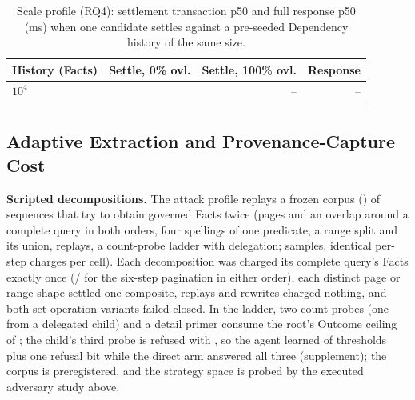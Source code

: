\documentclass[10pt,journal,compsoc]{IEEEtran}
\begin{document}
\begin{table}[t]
\centering
\caption{Scale profile (RQ4): settlement transaction p50 and full response
p50 (ms) when one candidate settles against a pre-seeded Dependency history
of the same size.}
\label{tab:scale-main}
\scriptsize
\setlength{\tabcolsep}{4pt}
\begin{tabular}{lrrr}
\toprule
History (Facts) & Settle, 0\% ovl. & Settle, 100\% ovl. & Response \\
\midrule
$10^4$ & \FinalVFivePublicationScaleSettleTenKMS{} & -- & -- \\
\FinalVFivePublicationScaleMillionHistory{} & \FinalVFivePublicationScaleSettleMillionMS{} & \FinalVFivePublicationScaleSettleMillionFullOverlapMS{} & \FinalVFivePublicationScaleMillionDrainMS{} \\
\bottomrule
\end{tabular}
\end{table}

\subsection{Adaptive Extraction and Provenance-Capture Cost}
\label{sec:attack-provsql}

\textbf{Scripted decompositions.} The attack profile replays a frozen
corpus (\FinalVFivePublicationAttackCorpusDigest{}) of
\FinalVFivePublicationAttackSequences{} sequences that try to obtain
governed Facts twice (pages and an overlap around a complete query in both
orders, four spellings of one predicate, a range split and its union,
replays, a count-probe ladder with delegation;
\FinalVFivePublicationAttackSamples{} samples, identical per-step charges
per cell). Each decomposition was charged its complete query's Facts
exactly once
(\FinalVFivePublicationAttackPaginationReleaseFacts{}/\FinalVFivePublicationAttackPaginationDependencyFacts{}
for the six-step pagination in either order), each distinct page or range
shape settled one composite, replays and rewrites charged nothing, and both
set-operation variants failed closed. In the ladder, two count probes (one
from a delegated child) and a detail primer consume the root's Outcome
ceiling of \FinalVFivePublicationAttackThresholdCeiling{}; the child's third
probe is refused with \FinalVFivePublicationAttackThresholdRejectionCode{},
so the agent learned \FinalVFivePublicationAttackThresholdAnswered{} of
\FinalVFivePublicationAttackThresholdProbes{} thresholds plus one refusal
bit while the direct arm answered all three (supplement); the corpus is
preregistered, and the strategy space is probed by the executed adversary
study above.
\end{document}

